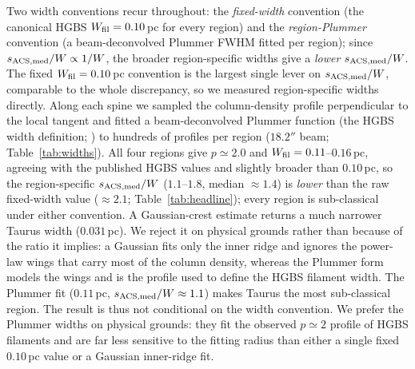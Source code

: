 \documentclass[usenatbib,twoside,twocolumn]{mnras}
\begin{document}
Two width conventions recur throughout: the \emph{fixed-width} convention (the canonical HGBS $W_{\rm fil}=0.10$\,pc for every region) and the \emph{region-Plummer} convention (a beam-deconvolved Plummer FWHM fitted per region); since $s_{\rm ACS,med}/W\propto1/W$, the broader region-specific widths give a \emph{lower} $s_{\rm ACS,med}/W$. The fixed $W_{\rm fil}=0.10$\,pc convention is the largest single lever on $s_{\rm ACS,med}/W$, comparable to the whole discrepancy, so we measured region-specific widths directly. Along each spine we sampled the column-density profile perpendicular to the local tangent and fitted a beam-deconvolved Plummer function (the HGBS width definition; \citealt{Arzoumanian2019}) to hundreds of profiles per region ($18.2''$ beam; Table~\ref{tab:widths}). All four regions give $p\simeq2.0$ and $W_{\rm fil}=0.11$--$0.16$\,pc, agreeing with the published HGBS values and slightly broader than $0.10$\,pc, so the region-specific $s_{\rm ACS,med}/W$ ($1.1$--$1.8$, median $\approx1.4$) is \emph{lower} than the raw fixed-width value ($\approx2.1$; Table~\ref{tab:headline}); every region is sub-classical under either convention. A Gaussian-crest estimate returns a much narrower Taurus width ($0.031$\,pc). We reject it on physical grounds rather than because of the ratio it implies: a Gaussian fits only the inner ridge and ignores the power-law wings that carry most of the column density, whereas the Plummer form models the wings and is the profile used to define the HGBS filament width. The Plummer fit ($0.11$\,pc, $s_{\rm ACS,med}/W\approx1.1$) makes Taurus the most sub-classical region. The result is thus not conditional on the width convention. We prefer the Plummer widths on physical grounds: they fit the observed $p\simeq2$ profile of HGBS filaments and are far less sensitive to the fitting radius than either a single fixed $0.10$\,pc value or a Gaussian inner-ridge fit.
\end{document}
